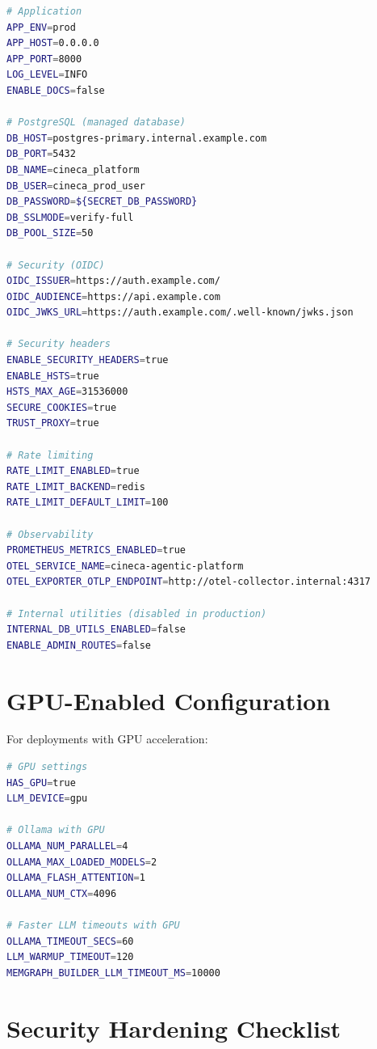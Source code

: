 \documentclass[a4paper,twoside]{sapthesis}
\begin{document}
\begin{lstlisting}[language=bash,caption={.env.production}]
# Application
APP_ENV=prod
APP_HOST=0.0.0.0
APP_PORT=8000
LOG_LEVEL=INFO
ENABLE_DOCS=false

# PostgreSQL (managed database)
DB_HOST=postgres-primary.internal.example.com
DB_PORT=5432
DB_NAME=cineca_platform
DB_USER=cineca_prod_user
DB_PASSWORD=${SECRET_DB_PASSWORD}
DB_SSLMODE=verify-full
DB_POOL_SIZE=50

# Security (OIDC)
OIDC_ISSUER=https://auth.example.com/
OIDC_AUDIENCE=https://api.example.com
OIDC_JWKS_URL=https://auth.example.com/.well-known/jwks.json

# Security headers
ENABLE_SECURITY_HEADERS=true
ENABLE_HSTS=true
HSTS_MAX_AGE=31536000
SECURE_COOKIES=true
TRUST_PROXY=true

# Rate limiting
RATE_LIMIT_ENABLED=true
RATE_LIMIT_BACKEND=redis
RATE_LIMIT_DEFAULT_LIMIT=100

# Observability
PROMETHEUS_METRICS_ENABLED=true
OTEL_SERVICE_NAME=cineca-agentic-platform
OTEL_EXPORTER_OTLP_ENDPOINT=http://otel-collector.internal:4317

# Internal utilities (disabled in production)
INTERNAL_DB_UTILS_ENABLED=false
ENABLE_ADMIN_ROUTES=false
\end{lstlisting}

\section{GPU-Enabled Configuration}
\label{app:config:gpu}

For deployments with GPU acceleration:

\begin{lstlisting}[language=bash,caption={.env.gpu}]
# GPU settings
HAS_GPU=true
LLM_DEVICE=gpu

# Ollama with GPU
OLLAMA_NUM_PARALLEL=4
OLLAMA_MAX_LOADED_MODELS=2
OLLAMA_FLASH_ATTENTION=1
OLLAMA_NUM_CTX=4096

# Faster LLM timeouts with GPU
OLLAMA_TIMEOUT_SECS=60
LLM_WARMUP_TIMEOUT=120
MEMGRAPH_BUILDER_LLM_TIMEOUT_MS=10000
\end{lstlisting}

\section{Security Hardening Checklist}
\label{app:config:security-checklist}
\end{document}
